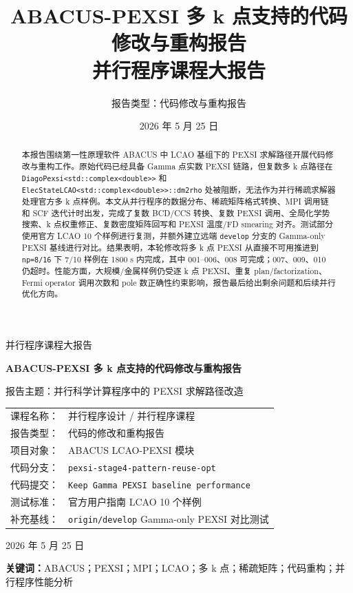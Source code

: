 \documentclass[a4paper,11pt]{article}
\title{\textbf{ABACUS-PEXSI 多 k 点支持的代码修改与重构报告}\\
\large 并行程序课程大报告}
\author{报告类型：代码修改与重构报告}
\date{2026 年 5 月 25 日}
\newcommand{\code}[1]{\texttt{#1}}
\begin{document}
\begin{titlepage}
\centering
\vspace*{1.8cm}
{\Large 并行程序课程大报告\par}
\vspace{1.2cm}
{\huge\bfseries ABACUS-PEXSI 多 k 点支持的代码修改与重构报告\par}
\vspace{1.6cm}
{\large 报告主题：并行科学计算程序中的 PEXSI 求解路径改造\par}
\vspace{1.8cm}
\begin{tabular}{rl}
课程名称： & 并行程序设计 / 并行程序课程\\
报告类型： & 代码的修改和重构报告\\
项目对象： & ABACUS LCAO-PEXSI 模块\\
代码分支： & \code{pexsi-stage4-pattern-reuse-opt}\\
代码提交： & \code{Keep Gamma PEXSI baseline performance}\\
测试标准： & 官方用户指南 LCAO 10 个样例\\
补充基线： & \code{origin/develop} Gamma-only PEXSI 对比测试\\
\end{tabular}
\vfill
{\large 2026 年 5 月 25 日\par}
\end{titlepage}

\begin{abstract}
本报告围绕第一性原理软件 ABACUS 中 LCAO 基组下的 PEXSI 求解路径开展代码修改与重构工作。原始代码已经具备 Gamma 点实数 PEXSI 链路，但复数多 k 点路径在 \code{DiagoPexsi<std::complex<double>>} 和 \code{ElecStateLCAO<std::complex<double>>::dm2rho} 处被阻断，无法作为并行稀疏求解器处理官方多 k 点样例。本文从并行程序的数据分布、稀疏矩阵格式转换、MPI 调用链和 SCF 迭代计时出发，完成了复数 BCD/CCS 转换、复数 PEXSI 调用、全局化学势搜索、k 点权重修正、复数密度矩阵回写和 PEXSI 温度/FD smearing 对齐。测试部分使用官方 LCAO 10 个样例进行复测，并额外建立远端 \code{develop} 分支的 Gamma-only PEXSI 基线进行对比。结果表明，本轮修改将多 k 点 PEXSI 从直接不可用推进到 \code{np=8/16} 下 7/10 样例在 1800 s 内完成，其中 001--006、008 可完成；007、009、010 仍超时。性能方面，大规模/金属样例仍受逐 k 点 PEXSI、重复 plan/factorization、Fermi operator 调用次数和 pole 数正确性约束影响，报告最后给出剩余问题和后续并行优化方向。
\end{abstract}

\noindent\textbf{关键词：}ABACUS；PEXSI；MPI；LCAO；多 k 点；稀疏矩阵；代码重构；并行程序性能分析
\end{document}
